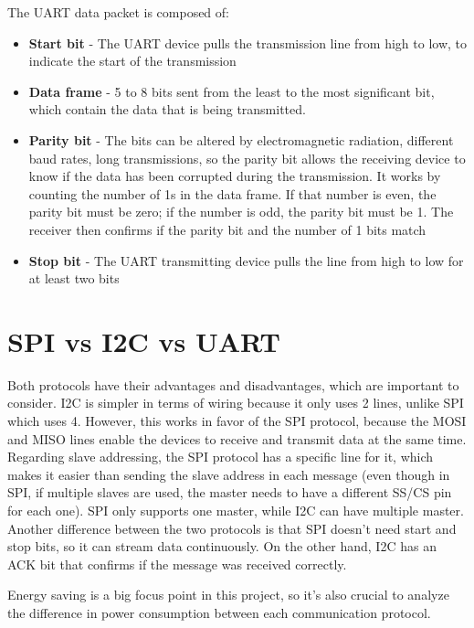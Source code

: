 \documentclass[portuguese]{ist-thesis}
\begin{document}
The UART data packet is composed of:

\begin{itemize}
    \item \textbf{Start bit} - The UART device pulls the transmission line from high to low, to indicate the start of the transmission
    \item \textbf{Data frame} - 5 to 8 bits sent from the least to the most significant bit, which contain the data that is being transmitted.
    \item \textbf{Parity bit} -  The bits can be altered by electromagnetic radiation, different baud rates, long transmissions, so the parity bit allows the receiving device to know if the data has been corrupted during the transmission. It works by counting the number of 1s in the data frame. If that number is even, the parity bit must be zero; if the number is odd, the parity bit must be 1. The receiver then confirms if the parity bit and the number of 1 bits match
    \item \textbf{Stop bit} - The UART transmitting device pulls the line from high to low for at least two bits
\end{itemize}

\section{SPI vs I2C vs UART}

Both protocols have their advantages and disadvantages, which are important to consider. I2C is simpler in terms of wiring because it only uses 2 lines, unlike SPI which uses 4. However, this works in favor of the SPI protocol, because the MOSI and MISO lines enable the devices to receive and transmit data at the same time. 
Regarding slave addressing, the SPI protocol has a specific line for it, which makes it easier than sending the slave address in each message (even though in SPI, if multiple slaves are used, the master needs to have a different SS/CS pin for each one). SPI only supports one master, while I2C can have multiple master. 
Another difference between the two protocols is that SPI doesn't need start and stop bits, so it can stream data continuously. On the other hand, I2C has an ACK bit that confirms if the message was received correctly.



Energy saving is a big focus point in this project, so it's also crucial to analyze the difference in power consumption between each communication protocol.
\end{document}
